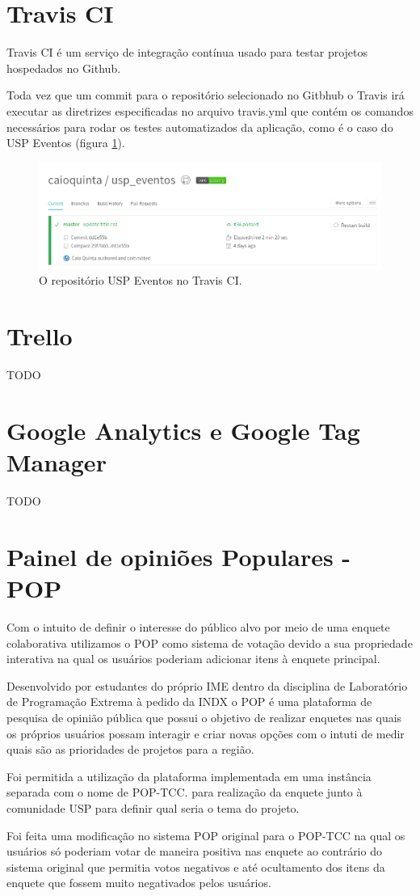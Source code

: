 \section{Travis CI}
\par Travis CI é um serviço de integração contínua usado para testar projetos hospedados no Github.
\par Toda vez que um commit para o repositório selecionado no Gitbhub o Travis irá executar as diretrizes especificadas no arquivo travis.yml que contém os comandos necessários para rodar os testes automatizados da aplicação, como é o caso do USP Eventos (figura \ref{fig:travis}).
\begin{figure}[htb]
\centering
\includegraphics[width=15cm]{figuras/travis}
\caption{\label{fig:travis} O repositório USP Eventos no Travis CI.}
\end{figure}

\section{Trello}
TODO

\section{Google Analytics e Google Tag Manager}
TODO
\section{Painel de opiniões Populares - POP}
\par Com o intuito de definir o interesse do público alvo por meio de uma enquete colaborativa utilizamos o POP como sistema de votação devido a sua propriedade interativa na qual os usuários poderiam adicionar itens à enquete principal.
\par Desenvolvido por estudantes do próprio IME dentro da disciplina de Laboratório de Programação Extrema à pedido da INDX o POP é uma plataforma de pesquisa de opinião pública que possui o objetivo de realizar enquetes nas quais os próprios usuários possam interagir e criar novas opções com o intuti de medir quais são as prioridades de projetos para a região.
\par Foi permitida a utilização da plataforma implementada em uma instância separada com o nome de POP-TCC. para realização da enquete junto à comunidade USP para definir qual seria o tema do projeto.
\par Foi feita uma modificação no sistema POP original para o POP-TCC na qual os usuários só poderiam votar de maneira positiva nas enquete ao contrário do sistema original que permitia votos negativos e até ocultamento dos itens da enquete que fossem muito negativados pelos usuários.
